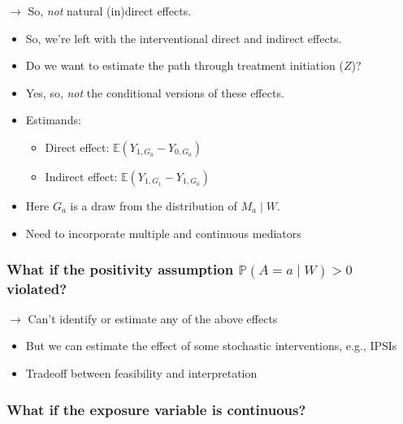 \documentclass[
  12pt,
]{book}
\providecommand{\tightlist}{%
  \setlength{\itemsep}{0pt}\setlength{\parskip}{0pt}}
\theoremstyle{definition}
\theoremstyle{definition}
\theoremstyle{definition}
\renewcommand{\P}{\mathbb{P}}
\newcommand{\E}{\mathbb{E}}
\newcommand{\1}{\mathbbm{1}}
\begin{document}
\(\rightarrow\) So, \emph{not} natural (in)direct effects.

\begin{itemize}
\tightlist
\item
  So, we're left with the interventional direct and indirect effects.
\item
  Do we want to estimate the path through treatment initiation (\(Z\))?
\item
  Yes, so, \emph{not} the conditional versions of these effects.
\item
  Estimands:

  \begin{itemize}
  \tightlist
  \item
    Direct effect: \(\E(Y_{1,G_0} - Y_{0,G_0})\)
  \item
    Indirect effect: \(\E(Y_{1,G_1} - Y_{1,G_0})\)
  \end{itemize}
\item
  Here \(G_a\) is a draw from the distribution of \(M_a\mid W\).
\item
  Need to incorporate multiple and continuous mediators
\end{itemize}

\hypertarget{what-if-the-positivity-assumption-paamid-w0-violated}{%
\subsubsection*{\texorpdfstring{What if the positivity assumption \(\P(A=a\mid W)>0\) violated?}{What if the positivity assumption \textbackslash P(A=a\textbackslash mid W)\textgreater0 violated?}}\label{what-if-the-positivity-assumption-paamid-w0-violated}}


\(\rightarrow\) Can't identify or estimate any of the above effects

\begin{itemize}
\tightlist
\item
  But we can estimate the effect of some stochastic interventions, e.g., IPSIs
\item
  Tradeoff between feasibility and interpretation
\end{itemize}

\hypertarget{what-if-the-exposure-variable-is-continuous}{%
\subsubsection*{What if the exposure variable is continuous?}\label{what-if-the-exposure-variable-is-continuous}}
\end{document}
